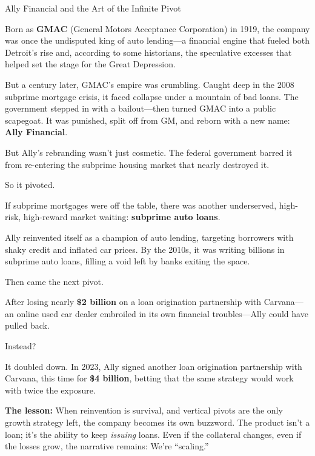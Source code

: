 \begin{HistoricalSidebar}{Ally Financial and the Art of the Infinite Pivot}

  Born as \textbf{GMAC} (General Motors Acceptance Corporation) in 1919, the company was once the undisputed king of auto lending—a financial engine that fueled both Detroit’s rise and, according to some historians, the speculative excesses that helped set the stage for the Great Depression.

  \medskip
  
  But a century later, GMAC’s empire was crumbling. Caught deep in the 2008 subprime mortgage crisis, it faced collapse under a mountain of bad loans. The government stepped in with a bailout—then turned GMAC into a public scapegoat. It was punished, split off from GM, and reborn with a new name: \textbf{Ally Financial}.
  
  \medskip
  
  But Ally’s rebranding wasn’t just cosmetic. The federal government barred it from re-entering the subprime housing market that nearly destroyed it.

  \medskip
  
  So it pivoted.

  \medskip
  
  If subprime mortgages were off the table, there was another underserved, high-risk, high-reward market waiting: \textbf{subprime auto loans}.
  
  \medskip
  
  Ally reinvented itself as a champion of auto lending, targeting borrowers with shaky credit and inflated car prices. By the 2010s, it was writing billions in subprime auto loans, filling a void left by banks exiting the space.
  
  \medskip
  
  Then came the next pivot.

  \medskip
  
  After losing nearly \textbf{\$2 billion} on a loan origination partnership with Carvana—an online used car dealer embroiled in its own financial troubles—Ally could have pulled back.

  \medskip
  
  Instead?

  \medskip
  
  It doubled down. In 2023, Ally signed another loan origination partnership with Carvana, this time for \textbf{\$4 billion}, betting that the same strategy would work with twice the exposure.
  
  \medskip
  
  \textbf{The lesson:} When reinvention is survival, and vertical pivots are the only growth strategy left, the company becomes its own buzzword. The product isn’t a loan; it’s the ability to keep \textit{issuing} loans. Even if the collateral changes, even if the losses grow, the narrative remains: We’re “scaling.”
  
\end{HistoricalSidebar}
